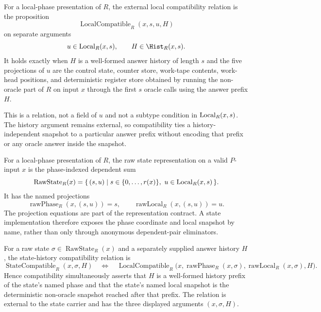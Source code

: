 \begin{definition}
  \label{def:oracle-reduction-local-compatible}
  For a local-phase presentation of $R$, the external local compatibility
  relation is the proposition
  \[
    \operatorname{LocalCompatible}_R(x,s,u,H)
  \]
  on separate arguments
  \[
    u\in\Local_R(x,s),\qquad H\in\Hist_R(x,s).
  \]
  It holds exactly when $H$ is a well-formed answer history of length $s$ and
  the five projections of $u$ are the control state, counter store, work-tape
  contents, work-head positions, and deterministic register store obtained by
  running the non-oracle part of $R$ on input $x$ through the first $s$ oracle
  calls using the answer prefix $H$.

  This is a relation, not a field of $u$ and not a subtype condition in
  $\operatorname{Local}_R(x,s)$.  The history argument remains external, so compatibility
  ties a history-independent snapshot to a particular answer prefix without
  encoding that prefix or any oracle answer inside the snapshot.
\end{definition}

\begin{definition}
  \label{def:oracle-reduction-raw-state-representation}
  For a local-phase presentation of $R$, the raw state representation on a
  valid $P$-input $x$ is the phase-indexed dependent sum
  \[
    \operatorname{RawState}_R(x)
    =
    \{\, (s,u)\mid s\in\{0,\ldots,r(x)\},\ u\in\Local_R(x,s)\,\}.
  \]
  It has the named projections
  \[
    \operatorname{rawPhase}_R(x,(s,u))=s,\qquad
    \operatorname{rawLocal}_R(x,(s,u))=u.
  \]
  The projection equations are part of the representation contract.  A state
  implementation therefore exposes the phase coordinate and local snapshot by
  name, rather than only through anonymous dependent-pair eliminators.
\end{definition}

\begin{definition}
  \label{def:oracle-reduction-state-compatible}
  For a raw state $\sigma\in\operatorname{RawState}_R(x)$ and a separately
  supplied answer history $H$, the state-history compatibility relation is
  \[
    \operatorname{StateCompatible}_R(x,\sigma,H)
    \quad\Longleftrightarrow\quad
    \operatorname{LocalCompatible}_R
      \bigl(x,\operatorname{rawPhase}_R(x,\sigma),
        \operatorname{rawLocal}_R(x,\sigma),H\bigr).
  \]
  Hence compatibility simultaneously asserts that $H$ is a well-formed history
  prefix of the state's named phase and that the state's named local snapshot
  is the deterministic non-oracle snapshot reached after that prefix.  The
  relation is external to the state carrier and has the three displayed
  arguments $(x,\sigma,H)$.
\end{definition}

